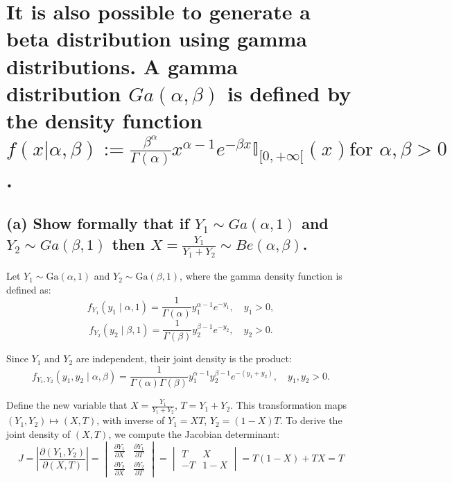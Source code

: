 \newpage

\section{It is also possible to generate a beta distribution using gamma distributions. A gamma distribution $Ga(\alpha, \beta)$ is defined by the density function $f(x|\alpha, \beta) := \frac{\beta^\alpha}{\Gamma(\alpha)} x^{\alpha - 1} e^{-\beta x} \mathbb{I}_{[0, +\infty[}(x) \text{for } \alpha, \beta > 0$.} \label{sec:5}


\subsection*{(a) Show formally that if $Y_1 \sim Ga(\alpha, 1)$ and $Y_2 \sim Ga(\beta, 1)$ then $X = \frac{Y_1}{Y_1 + Y_2} \sim Be(\alpha, \beta)$.}

Let $Y_1 \sim \text{Ga}(\alpha, 1)$ and $Y_2 \sim \text{Ga}(\beta, 1)$, where the gamma density function is defined as:
\begin{equation}
f_{Y_1}(y_1 \mid \alpha, 1) = \frac{1}{\Gamma(\alpha)} y_1^{\alpha - 1} e^{-y_1}, \quad y_1 > 0,
\end{equation}
\begin{equation}
f_{Y_2}(y_2 \mid \beta, 1) = \frac{1}{\Gamma(\beta)} y_2^{\beta - 1} e^{-y_2}, \quad y_2 > 0.
\end{equation}

Since \(Y_1\) and \(Y_2\) are independent, their joint density is the product:
\begin{equation}
f_{Y_1,Y_2}(y_1, y_2 \mid \alpha, \beta) = \frac{1}{\Gamma(\alpha)\Gamma(\beta)} y_1^{\alpha - 1} y_2^{\beta - 1} e^{-(y_1 + y_2)}, \quad y_1, y_2 > 0.
\end{equation}

Define the new variable that $X = \frac{Y_1}{Y_1 + Y_2}$, $T = Y_1 + Y_2$. This transformation maps $(Y_1, Y_2) \mapsto (X, T)$, with inverse of $Y_1 = X T$, $Y_2 = (1 - X) T$. To derive the joint density of $(X, T)$, we compute the Jacobian determinant:
\[
J = \left| \frac{\partial (Y_1, Y_2)}{\partial (X, T)} \right| = 
\begin{vmatrix}
\frac{\partial Y_1}{\partial X} & \frac{\partial Y_1}{\partial T} \\
\frac{\partial Y_2}{\partial X} & \frac{\partial Y_2}{\partial T}
\end{vmatrix}
=
\begin{vmatrix}
T & X \\
- T & 1 - X
\end{vmatrix}
= T(1 - X) + T X = T
\]

